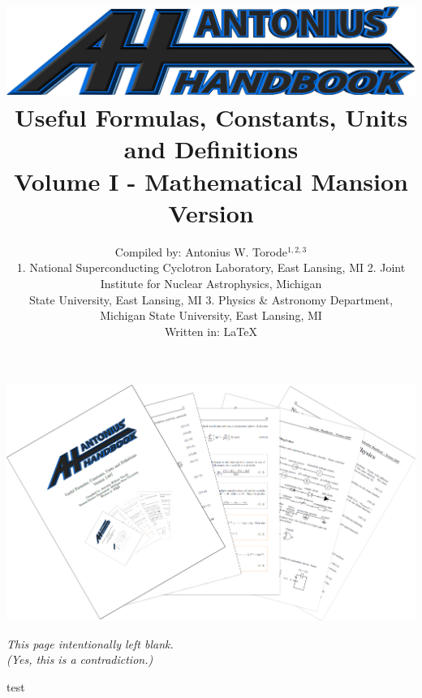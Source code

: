 \documentclass[openany,twoside, notitlepage,letterpaper,11pt]{book}
\title{\includegraphics[scale=.22]{./Images/Covers/AH2.png}
	\\ \vspace{1.5cm} Useful Formulas, Constants, Units and Definitions \\ Volume I - Mathematical Mansion \\ Version \Version}
\date{}
\author{Compiled by: Antonius W. Torode$^{1,2,3}$ \\ \scriptsize{1. National Superconducting Cyclotron Laboratory, East Lansing, MI 2. Joint Institute for Nuclear Astrophysics, Michigan} \\ \scriptsize{State University, East Lansing, MI 3. Physics \& Astronomy Department, Michigan State University, East Lansing, MI} \\ Written in: \LaTeX}
\begin{document}
\frontmatter
\maketitle
\thispagestyle{empty}
\pagestyle{empty}
\begin{center}
	\includegraphics[scale=1.8]{./Images/Covers/background_tunnel.png}
\end{center}





\thispagestyle{empty}
\newpage
{}
\begin{center}
	\textit{This page intentionally left blank.\\ (Yes, this is a contradiction.)}
\end{center}

\tableofcontents


\setlength{\parindent}{0pt}
\mainmatter

test


\backmatter

\printindex
\end{document}
